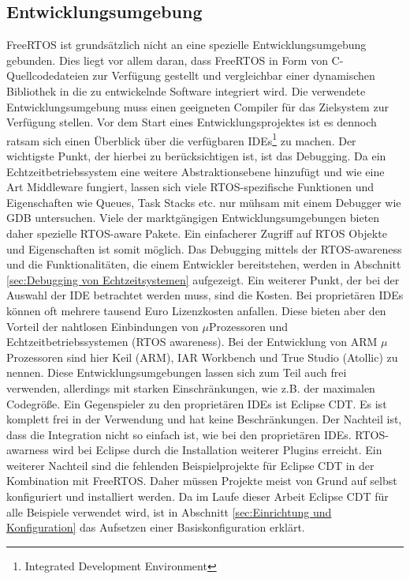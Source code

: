 \subsection{Entwicklungsumgebung}
\label{ref:Entwicklungsumgebung}
FreeRTOS ist grundsätzlich nicht an eine spezielle Entwicklungsumgebung gebunden. Dies liegt vor allem daran, dass FreeRTOS in Form von C-Quellcodedateien zur Verfügung gestellt und vergleichbar einer dynamischen Bibliothek in die zu entwickelnde Software integriert wird. Die verwendete Entwicklungsumgebung muss einen geeigneten Compiler für das Zielsystem zur Verfügung stellen. Vor dem Start eines Entwicklungsprojektes ist es dennoch ratsam sich einen Überblick über die ver\-fügbaren IDEs\footnote{Integrated Development Environment} zu machen. Der wichtigste Punkt, der hierbei zu berücksichtigen ist, ist das Debugging. Da ein Echtzeitbetriebssystem eine weitere Abstraktionsebene hinzufügt und wie eine Art Middleware fungiert, lassen sich viele RTOS-spezifische Funktionen und Eigenschaften wie Queues, Task Stacks etc. nur mühsam mit einem Debugger wie GDB untersuchen. Viele der markt\-gäng\-igen Entwicklungsumgebungen bieten daher spezielle RTOS-aware Pakete. Ein einfacherer Zugriff auf RTOS Objekte und Eigenschaften ist somit möglich. Das Debugging mittels der RTOS-awareness und die Funktionalitäten, die einem Entwickler bereitstehen, werden in Abschnitt \ref{sec:Debugging von Echtzeitsystemen} aufgezeigt. Ein weiterer Punkt, der bei der Auswahl der IDE betrachtet werden muss, sind die Kosten. Bei proprietären IDEs können oft mehrere tausend Euro Lizenzkosten anfallen. Diese bieten aber den Vorteil der nahtlosen Einbindungen von $\mu$Prozessoren und Echtzeitbetriebssystemen (RTOS\- aware\-ness). Bei der Entwicklung von ARM $\mu$\-Prozessoren sind hier Keil (ARM), IAR Workbench und True Studio (Atollic) zu nennen. Diese Entwicklungsumgebungen lassen sich zum Teil auch frei verwenden, allerdings mit starken Einschränkungen, wie z.B. der maximalen Codegröße. Ein Gegenspieler zu den proprietären IDEs ist Eclipse CDT. Es ist komplett frei in der Verwendung und hat keine Beschränkungen. Der Nachteil ist, dass die Integration nicht so einfach ist, wie bei den proprietären IDEs. RTOS-awarness wird bei Eclipse durch die Installation weiterer Plugins erreicht. Ein weiterer Nachteil sind die fehlenden Beispielprojekte für Eclipse CDT in der Kombination mit FreeRTOS. Daher müssen Projekte meist von Grund auf selbst konfiguriert und installiert werden. Da im Laufe dieser Arbeit Eclipse CDT für alle Beispiele verwendet wird, ist in Abschnitt \ref{sec:Einrichtung und Konfiguration} das Aufsetzen einer Basiskonfiguration erklärt.